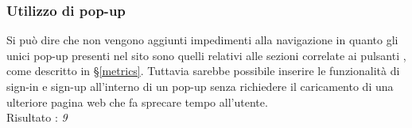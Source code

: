 \subsubsection{Utilizzo di pop-up}
Si può dire che non vengono aggiunti
impedimenti alla navigazione in quanto gli 
unici pop-up presenti nel sito sono quelli relativi alle sezioni 
correlate ai pulsanti , come descritto in
§\ref{metrics}. Tuttavia sarebbe possibile inserire le funzionalità di
sign-in e sign-up all'interno di un pop-up senza richiedere il caricamento
di una ulteriore pagina web che fa sprecare tempo all'utente. \\
Risultato : \textit{9}

